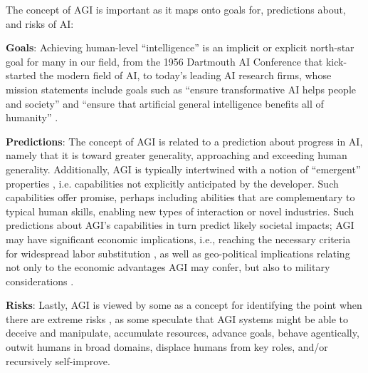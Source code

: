 \documentclass{article}
\theoremstyle{plain}
\theoremstyle{definition}
\theoremstyle{remark}
\begin{document}
The concept of AGI
is important as it maps onto goals for, predictions about, and risks of AI:

\textbf{Goals}: Achieving human-level “intelligence” is an implicit or explicit north-star goal for many in our field, from the 1956 Dartmouth AI Conference \citep{dartmouthAI} that kick-started the modern field of AI, 
to today's leading AI research firms, whose mission statements include goals such as
“ensure transformative AI helps people and society” \citep{anthMission} and “ensure that artificial general intelligence benefits all of humanity” \citep{openAIMission}. 

\textbf{Predictions}: The concept of AGI is related to a prediction about progress in AI, namely that it is toward greater generality, approaching and exceeding human generality. Additionally, AGI is typically intertwined with a notion of “emergent” properties \citep{wei2022emergent}, i.e. capabilities not explicitly anticipated by the developer. Such capabilities offer promise, perhaps including abilities that are complementary to typical human skills, enabling new types of interaction or novel industries. Such predictions about AGI's capabilities in turn predict likely societal impacts; AGI may have significant economic implications, i.e., reaching the necessary criteria for widespread labor substitution \citep{laborMcK, centaurs, eloundou2023gpts}, as well as geo-political implications relating not only to the economic advantages AGI may confer, but also to military considerations \citep{kissinger}.  

\textbf{Risks}: Lastly, AGI is viewed by some as a concept for identifying the point when there are extreme risks \citep{shevlane2023model, riskPaper}, as  some speculate that AGI systems might be able to deceive and manipulate, accumulate resources, advance goals, behave agentically, outwit humans in broad domains, displace humans from key roles, and/or recursively self-improve.
\end{document}
